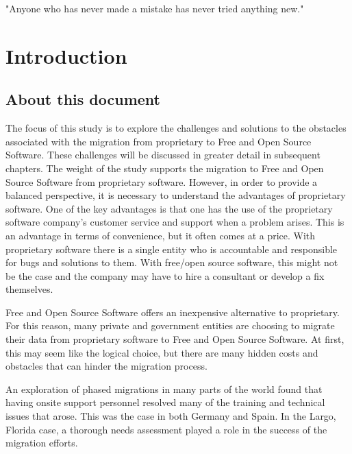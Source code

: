 \newpage
\begin{savequote}[108mm]
 "Anyone who has never made a mistake has never tried anything new." 
\end{savequote}
\chapter{Introduction}
\vspace{-3cm}
\label{chap:introduction}
  \section{About this document}
  \label{sec:about}
  The focus of this study is to explore the challenges and solutions to the obstacles associated with the migration from proprietary to Free and Open Source Software. These challenges will be discussed in greater detail in subsequent chapters. The weight of the study supports the migration to Free and Open Source Software from proprietary software. However, in order to provide a balanced perspective, it is necessary to understand the advantages of proprietary software. One of the key advantages is that one has the use of the proprietary software company's customer service and support when a problem arises. This is an advantage in terms of convenience, but it often comes at a price. With proprietary software there is a single entity who is accountable and responsible for bugs and solutions to them. With free/open source software, this might not be the case and the company may have to hire a consultant or develop a fix themselves.  

  Free and Open Source Software offers an inexpensive alternative to proprietary. For this reason, many private and government entities are choosing to migrate their data from proprietary software to Free and Open Source Software.  At first, this may seem like the logical choice, but there are many hidden costs and obstacles that can hinder the migration process. 

  An exploration of phased migrations in many parts of the world found that having onsite support personnel resolved many of the training and technical issues that arose. This was the case in both Germany and Spain. In the Largo, Florida case, a thorough needs assessment played a role in the success of the migration efforts.


